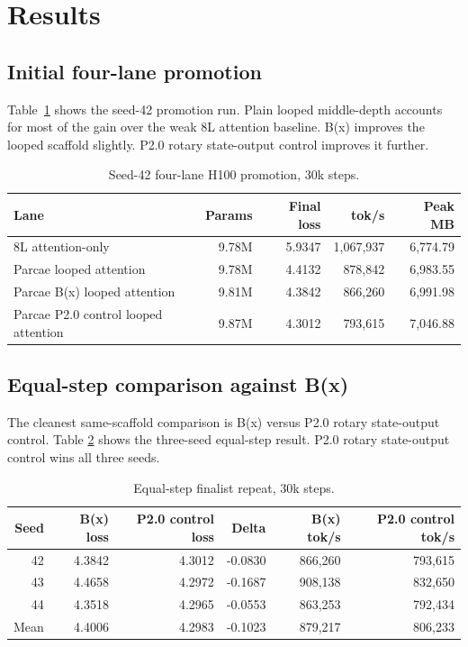 \documentclass[11pt]{article}
\newcommand{\pcontrol}{P2.0 rotary state-output control}
\newcommand{\pctrlshort}{P2.0 control}
\newcommand{\parcae}{Parcae}
\newcommand{\bx}{B(x)}
\begin{document}
\section{Results}

\subsection{Initial four-lane promotion}

Table~\ref{tab:promotion} shows the seed-42 promotion run. Plain looped
middle-depth accounts for most of the gain over the weak 8L attention baseline.
\bx{} improves the looped scaffold slightly. \pcontrol{} improves it further.

\begin{table}[h]
\centering
\caption{Seed-42 four-lane H100 promotion, 30k steps.}
\label{tab:promotion}
\begin{tabular}{lrrrr}
\toprule
Lane & Params & Final loss & tok/s & Peak MB \\
\midrule
8L attention-only & 9.78M & 5.9347 & 1,067,937 & 6,774.79 \\
\parcae{} looped attention & 9.78M & 4.4132 & 878,842 & 6,983.55 \\
\parcae{} \bx{} looped attention & 9.81M & 4.3842 & 866,260 & 6,991.98 \\
\parcae{} \pctrlshort{} looped attention & 9.87M & 4.3012 & 793,615 & 7,046.88 \\
\bottomrule
\end{tabular}
\end{table}

\subsection{Equal-step comparison against \bx{}}

The cleanest same-scaffold comparison is \bx{} versus \pcontrol{}. Table
\ref{tab:bx} shows the three-seed equal-step result. \pcontrol{} wins all
three seeds.

\begin{table}[h]
\centering
\caption{Equal-step finalist repeat, 30k steps.}
\label{tab:bx}
\begin{tabular}{rrrrrr}
\toprule
Seed & \bx{} loss & \pctrlshort{} loss & Delta & \bx{} tok/s & \pctrlshort{} tok/s \\
\midrule
42 & 4.3842 & 4.3012 & -0.0830 & 866,260 & 793,615 \\
43 & 4.4658 & 4.2972 & -0.1687 & 908,138 & 832,650 \\
44 & 4.3518 & 4.2965 & -0.0553 & 863,253 & 792,434 \\
\midrule
Mean & 4.4006 & 4.2983 & -0.1023 & 879,217 & 806,233 \\
\bottomrule
\end{tabular}
\end{table}
\end{document}
